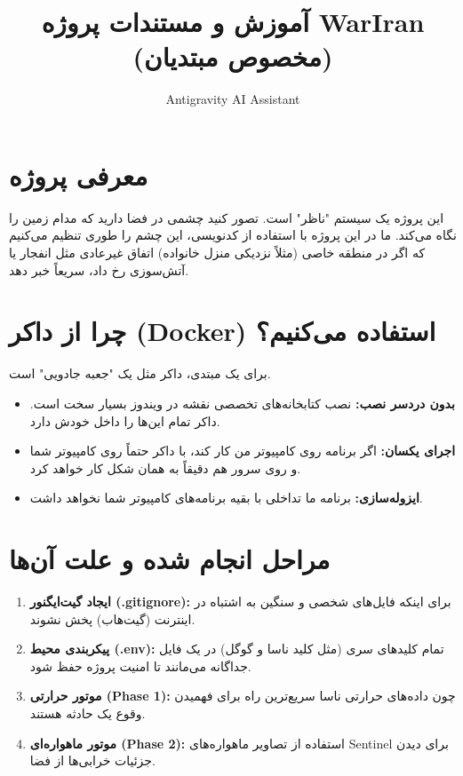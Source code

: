 \documentclass{article}
\title{آموزش و مستندات پروژه WarIran (مخصوص مبتدیان)}
\author{Antigravity AI Assistant}
\date{}
\begin{document}
\maketitle

\tableofcontents
\newpage

\section{معرفی پروژه}
این پروژه یک سیستم "ناظر" است. تصور کنید چشمی در فضا دارید که مدام زمین را نگاه می‌کند. ما در این پروژه با استفاده از کدنویسی، این چشم را طوری تنظیم می‌کنیم که اگر در منطقه خاصی (مثلاً نزدیکی منزل خانواده) اتفاق غیرعادی مثل انفجار یا آتش‌سوزی رخ داد، سریعاً خبر دهد.

\section{چرا از داکر (Docker) استفاده می‌کنیم؟}
برای یک مبتدی، داکر مثل یک "جعبه جادویی" است. 
\begin{itemize}
    \item \textbf{بدون دردسر نصب:} نصب کتابخانه‌های تخصصی نقشه در ویندوز بسیار سخت است. داکر تمام این‌ها را داخل خودش دارد.
    \item \textbf{اجرای یکسان:} اگر برنامه روی کامپیوتر من کار کند، با داکر حتماً روی کامپیوتر شما و روی سرور هم دقیقاً به همان شکل کار خواهد کرد.
    \item \textbf{ایزوله‌سازی:} برنامه ما تداخلی با بقیه برنامه‌های کامپیوتر شما نخواهد داشت.
\end{itemize}

\section{مراحل انجام شده و علت آن‌ها}
\begin{enumerate}
    \item \textbf{ایجاد گیت‌ایگنور (.gitignore):} برای اینکه فایل‌های شخصی و سنگین به اشتباه در اینترنت (گیت‌هاب) پخش نشوند.
    \item \textbf{پیکربندی محیط (.env):} تمام کلیدهای سری (مثل کلید ناسا و گوگل) در یک فایل جداگانه می‌مانند تا امنیت پروژه حفظ شود.
    \item \textbf{موتور حرارتی (Phase 1):} چون داده‌های حرارتی ناسا سریع‌ترین راه برای فهمیدن وقوع یک حادثه هستند.
    \item \textbf{موتور ماهواره‌ای (Phase 2):} استفاده از تصاویر ماهواره‌های Sentinel برای دیدن جزئیات خرابی‌ها از فضا.
\end{enumerate}
\end{document}
